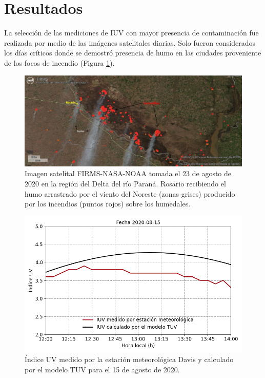 \section*{Resultados}

La selección de las mediciones de IUV con mayor presencia de contaminación fue realizada por medio de las imágenes satelitales diarias. Solo fueron considerados los días críticos donde se demostró presencia de humo en las ciudades proveniente de los focos de incendio (Figura \ref{fig:satelite}).

\begin{figure}[H]
    \centering
    \includegraphics[width=12cm]{Graphics/image13.jpg}
    \caption{Imagen satelital FIRMS-NASA-NOAA tomada el 23 de agosto de 2020 en la región del Delta del río Paraná. Rosario recibiendo el humo arrastrado por el viento del Noreste (zonas grises) producido por los incendios (puntos rojos) sobre los humedales.}
    \label{fig:satelite}
\end{figure}

\begin{figure}[H]
    \centering
    \includegraphics[width=12cm]{Graphics/image10.png}
    \caption{Índice UV medido por la estación meteorológica Davis y calculado por el modelo TUV para el 15 de agosto de 2020.}
    \label{fig:uvi_tuv}
\end{figure}

